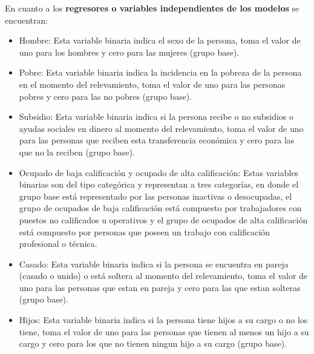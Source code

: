 \documentclass[12pt,a4paper]{article}
\begin{document}
En cuanto a los \textbf{regresores o variables independientes de los modelos} se encuentran:
\begin{itemize}
\item Hombre: Esta variable binaria indica el sexo de la persona, toma el valor de uno para los hombres y cero para las mujeres (grupo base).
\item Pobre: Esta variable binaria indica la incidencia en la pobreza de la persona en el momento del relevamiento, toma el valor de uno para las personas pobres y cero para las no pobres (grupo base).
\item Subsidio: Esta variable binaria indica si la persona recibe o no  subsidios o ayudas sociales en dinero al momento del relevamiento, toma el valor de uno para las personas que reciben esta transferencia económica y cero para las que no la reciben (grupo base).
\item Ocupado de baja calificación y ocupado de alta calificación: Estas variables binarias son del tipo categórica y representan a tres categorías, en donde el grupo base está representado por las personas inactivas o desocupadas, el grupo de ocupados de baja calificación está compuesto por trabajadores con puestos no calificados u operativos y el grupo de ocupados de alta calificación está compuesto por personas que poseen un trabajo con calificación profesional o técnica.
\item Casado: Esta variable binaria indica si la persona se encuentra en pareja (casado o unido) o está soltera al momento del relevamiento, toma el valor de uno para las personas que estan en pareja y cero para las que estan solteras (grupo base).
\item Hijos: Esta variable binaria indica si la persona tiene hijos a su cargo o no los tiene, toma el valor de uno para las personas que tienen al menos un hijo a su cargo y cero para los que no tienen ningun hijo a su cargo (grupo base). 

\end{itemize}
\end{document}
